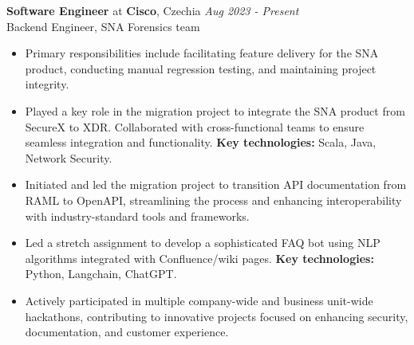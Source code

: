 
\textbf{Software Engineer} at \textbf{Cisco}, Czechia
\hfill {\em Aug 2023 - Present}\\
    {Backend Engineer, SNA Forensics team}
\begin{itemize}
    \item Primary responsibilities include facilitating feature delivery for the SNA product, conducting manual regression testing, and maintaining project integrity.
    \item Played a key role in the migration project to integrate the SNA product from SecureX to XDR. Collaborated with cross-functional teams to ensure seamless integration and functionality. \textbf{Key technologies:} Scala, Java, Network Security.
    \item Initiated and led the migration project to transition API documentation from RAML to OpenAPI, streamlining the process and enhancing interoperability with industry-standard tools and frameworks.
    \item Led a stretch assignment to develop a sophisticated FAQ bot using NLP algorithms integrated with Confluence/wiki pages. \textbf{Key technologies:} Python, Langchain, ChatGPT.
    \item Actively participated in multiple company-wide and business unit-wide hackathons, contributing to innovative projects focused on enhancing security, documentation, and customer experience.
\end{itemize}

